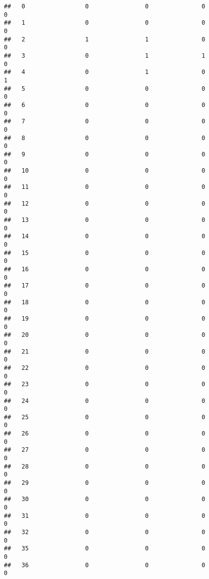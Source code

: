 \documentclass[]{article}
\begin{document}
\begin{verbatim}
##   0                 0                0               0                0
##   1                 0                0               0                0
##   2                 1                1               0                0
##   3                 0                1               1                0
##   4                 0                1               0                1
##   5                 0                0               0                0
##   6                 0                0               0                0
##   7                 0                0               0                0
##   8                 0                0               0                0
##   9                 0                0               0                0
##   10                0                0               0                0
##   11                0                0               0                0
##   12                0                0               0                0
##   13                0                0               0                0
##   14                0                0               0                0
##   15                0                0               0                0
##   16                0                0               0                0
##   17                0                0               0                0
##   18                0                0               0                0
##   19                0                0               0                0
##   20                0                0               0                0
##   21                0                0               0                0
##   22                0                0               0                0
##   23                0                0               0                0
##   24                0                0               0                0
##   25                0                0               0                0
##   26                0                0               0                0
##   27                0                0               0                0
##   28                0                0               0                0
##   29                0                0               0                0
##   30                0                0               0                0
##   31                0                0               0                0
##   32                0                0               0                0
##   35                0                0               0                0
##   36                0                0               0                0

\end{verbatim}
\end{document}
